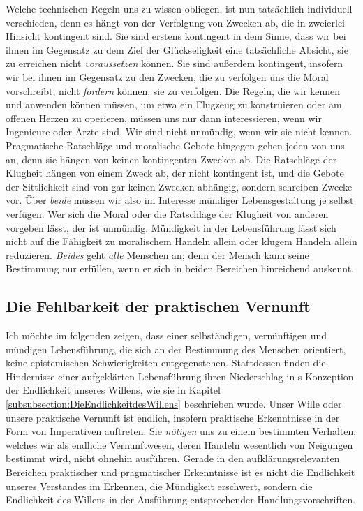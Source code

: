 Welche technischen Regeln uns zu wissen obliegen, ist nun tatsächlich
individuell verschieden, denn es hängt von der Verfolgung von Zwecken ab, die in zweierlei
Hinsicht kontingent sind. Sie sind erstens kontingent in dem Sinne, dass wir bei
ihnen im Gegensatz zu dem Ziel der Glückseligkeit eine tatsächliche Absicht, sie
zu erreichen nicht \emph{voraussetzen} können. Sie sind außerdem kontingent, insofern
wir bei ihnen im Gegensatz zu den Zwecken, die zu verfolgen uns die Moral
vorschreibt, nicht \emph{fordern} können, sie zu verfolgen. Die Regeln, die wir
kennen und anwenden können müssen, um etwa ein Flugzeug zu konstruieren oder am
offenen Herzen zu operieren, müssen uns nur dann interessieren, wenn wir
Ingenieure oder Ärzte sind. Wir sind nicht unmündig, wenn wir sie nicht kennen.
Pragmatische Ratschläge und moralische Gebote hingegen gehen jeden von uns an,
denn sie hängen von keinen kontingenten Zwecken ab. Die Ratschläge der Klugheit
hängen von einem Zweck ab, der nicht kontingent ist, und die Gebote der
Sittlichkeit sind von gar keinen Zwecken abhängig, sondern schreiben Zwecke vor.
Über \emph{beide} müssen wir also im Interesse mündiger Lebensgestaltung je
selbst verfügen. Wer sich die Moral oder die Ratschläge der Klugheit von anderen
vorgeben lässt, der ist unmündig. Mündigkeit in der Lebensführung lässt sich
nicht auf die Fähigkeit zu moralischem Handeln allein oder klugem Handeln allein
reduzieren. \emph{Beides} geht \emph{alle} Menschen an; denn der Mensch kann
seine Bestimmung nur erfüllen, wenn er sich in beiden Bereichen hinreichend auskennt.


\subsection{Die Fehlbarkeit der praktischen
Vernunft}\label{section:AufklaerungdesendlichenWillens}
Ich möchte im folgenden zeigen, dass einer
selbständigen, vernünftigen und mündigen Lebensführung, die sich an der
Bestimmung des Menschen orientiert, keine epistemischen Schwierigkeiten
entgegenstehen. Stattdessen finden die Hindernisse einer aufgeklärten Lebensführung
ihren Niederschlag in s Konzeption der Endlichkeit unseres
Willens, wie sie in Kapitel \ref{subsubsection:DieEndlichkeitdesWillens}
beschrieben wurde. Unser Wille oder unsere praktische Vernunft ist endlich,
insofern praktische Erkenntnisse in der Form von Imperativen auftreten. Sie
\emph{nötigen} uns zu einem bestimmten Verhalten, welches wir als endliche
Vernunftwesen, deren Handeln wesentlich von Neigungen bestimmt wird, nicht
ohnehin ausführen. Gerade in den aufklärungsrelevanten Bereichen praktischer und
pragmatischer Erkenntnisse ist es nicht die Endlichkeit unseres Verstandes im
Erkennen, die Mündigkeit erschwert, sondern die Endlichkeit des Willens in der
Ausführung entsprechender Handlungsvorschriften.

